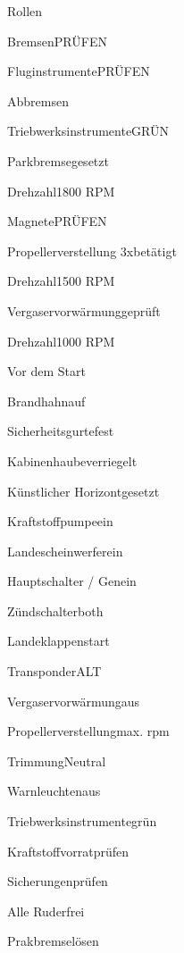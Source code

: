   \begin{checklist}{Rollen}
    \item{Bremsen}{PRÜFEN}
    \item{Fluginstrumente}{PRÜFEN}
  \end{checklist}
  \begin{checklist}{Abbremsen}
    \item{Triebwerksinstrumente}{GRÜN}
    \item{Parkbremse}{gesetzt}
    \item{Drehzahl}{1800 RPM}
    \item{Magnete}{PRÜFEN}
    \item{Propellerverstellung 3x}{betätigt}
    \item{Drehzahl}{1500 RPM}
    \item{Vergaservorwärmung}{geprüft}
    \item{Drehzahl}{1000 RPM}
  \end{checklist}

  \begin{checklist}{Vor dem Start}
    \item{Brandhahn}{auf}
    \item{Sicherheitsgurte}{fest}
    \item{Kabinenhaube}{verriegelt}
    \item{Künstlicher Horizont}{gesetzt}
    \item{Kraftstoffpumpe}{ein}
    \item{Landescheinwerfer}{ein}
    \item{Hauptschalter / Gen}{ein}
    \item{Zündschalter}{both}
    \item{Landeklappen}{start}
    \item{Transponder}{ALT}
    \item{Vergaservorwärmung}{aus}
    \item{Propellerverstellung}{max. rpm}
    \item{Trimmung}{Neutral}
    \item{Warnleuchten}{aus}
    \item{Triebwerksinstrumente}{grün}
    \item{Kraftstoffvorrat}{prüfen}
    \item{Sicherungen}{prüfen}
    \item{Alle Ruder}{frei}
    \item{Prakbremse}{lösen}
  \end{checklist}

